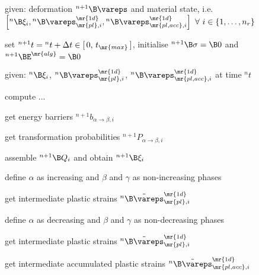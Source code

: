 \begin{algorithm}
    \begin{spacing}{0.7}
        \begin{algorithmic}[1]

            \State given: deformation ${}^{n+1}\B\vareps$ and material state, i.e.~$\left[ {}^{n}\B\xi_i, {}^{n}\B\vareps_{\mr{pl},i}^\mr{1d}, {}^{n}\B\vareps_{\mr{pl,acc},i}^\mr{1d} \right] ~ \forall ~ i \in \{ 1,\dots,n_r \}$

            \State set ${}^{n+1}t={}^{n}t+\Delta t \in [\, 0,\, t_\mr{max}\, ]$, initialise ${}^{n+1}\B\sigma = \B 0$ and ${}^{n+1}\BE^\mr{alg} = \B 0$


            \State given: ${}^n\B\xi_i$, ${}^n\B\vareps_{\mr{pl},i}^\mr{1d}$, ${}^{n}\B\vareps_{\mr{pl,acc},i}^\mr{1d}$ at time ${}^{n}t$

            \State compute ...


            \State get energy barriers ${}^{n+1}b_{\alpha\rightarrow\beta,i}$

            \State get transformation probabilities ${}^{n+1}P_{\alpha\rightarrow\beta,i}$

            \EndFor

            \State assemble ${}^{n+1}\B Q_i$ and obtain ${}^{n+1}\B\xi_i$


            \State define $\alpha$  as increasing and $\beta$ and $\gamma$ as non-increasing phases

            \State get intermediate plastic strains ${}^n\tilde{\B\vareps}_{\mr{pl},i}^\mr{1d}$

            \Else

            \State define $\alpha$ as decreasing and $\beta$ and $\gamma$ as non-decreasing phases

            \State get intermediate plastic strains ${}^n\tilde{\B\vareps}_{\mr{pl},i}^\mr{1d}$

            \EndIf

            \State get intermediate accumulated plastic strains ${}^n\tilde{\B\vareps}_{\mr{pl,acc},i}^\mr{1d}$


\end{algorithmic}
\end{spacing}
\end{algorithm}
